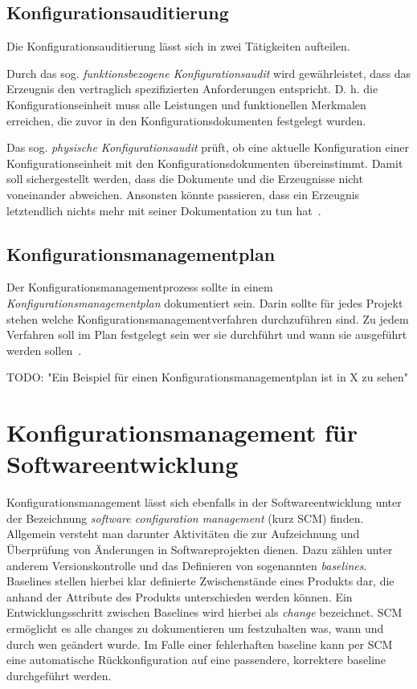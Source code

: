 \documentclass[runningheads,a4paper]{uwsese}
\begin{document}
\subsection{Konfigurationsauditierung}
Die Konfigurationsauditierung lässt sich in zwei Tätigkeiten aufteilen.

Durch das sog. {\em funktionsbezogene Konfigurationsaudit} wird gewährleistet,
dass das Erzeugnis den vertraglich spezifizierten Anforderungen entspricht.
D. h. die Konfigurationseinheit muss alle Leistungen und funktionellen Merkmalen
erreichen, die zuvor in den Konfigurationsdokumenten festgelegt wurden.

Das sog. {\em physische Konfigurationsaudit} prüft, ob eine aktuelle
Konfiguration einer Konfigurationseinheit mit den Konfigurationsdokumenten
übereinstimmt. Damit soll sichergestellt werden, dass die Dokumente und die
Erzeugnisse nicht voneinander abweichen. Ansonsten könnte passieren, dass
ein Erzeugnis letztendlich nichts mehr mit seiner Dokumentation zu tun
hat~\cite[S. 7]{weischedel2002}.

\subsection{Konfigurationsmanagementplan}
Der Konfigurationsmanagementprozess sollte in einem
{\em Konfigurationsmanagementplan} dokumentiert sein. Darin sollte für jedes
Projekt stehen welche Konfigurationsmanagementverfahren durchzuführen sind. Zu
jedem Verfahren soll im Plan festgelegt sein wer sie durchführt und wann sie
ausgeführt werden sollen~\cite[S. 7f]{weischedel2002}.

TODO: "Ein Beispiel für einen Konfigurationsmanagementplan ist in X zu sehen"

\section{Konfigurationsmanagement für Softwareentwicklung}


Konfigurationsmanagement lässt sich ebenfalls in der Softwareentwicklung
unter der Bezeichnung {\em software configuration management} (kurz SCM)
finden. Allgemein versteht man darunter Aktivitäten die zur Aufzeichnung und
Überprüfung von Änderungen in Softwareprojekten dienen. Dazu zählen unter
anderem Versionskontrolle und das Definieren von sogenannten {\em baselines}.
Baselines stellen hierbei klar definierte Zwischenstände eines Produkts dar, die
anhand der Attribute des Produkts unterschieden werden können. Ein
Entwicklungsschritt zwischen Baselines wird hierbei als {\em change} bezeichnet.
SCM ermöglicht es alle changes zu dokumentieren um festzuhalten was, wann
und durch wen geändert wurde. Im Falle einer fehlerhaften baseline kann per
SCM eine automatische Rückkonfiguration auf eine passendere, korrektere baseline
durchgeführt werden.
\end{document}
